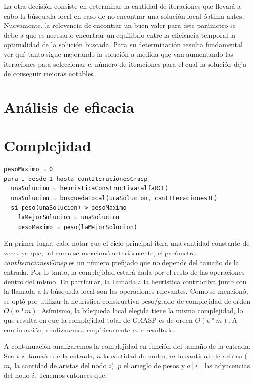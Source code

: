 \documentclass[a4paper,11pt] {article}
\begin{document}
La otra decisión consiste en determinar la cantidad de iteraciones que llevará a cabo la búsqueda local en caso de no encontrar una solución local óptima antes. Nuevamente, la relevancia de encontrar un buen valor para éste parámetro se debe a que es necesario encontrar un equilibrio entre la eficiencia temporal la optimalidad de la solución buscada. Para su determinación resulta fundamental ver qué tanto sigue mejorando la solución a medida que van aumentando las iteraciones para seleccionar el número de iteraciones para el cual la solución deja de conseguir mejoras notables.

\section*{An\'alisis de eficacia}

\section*{Complejidad}

\begin{verbatim}
pesoMaximo = 0
para i desde 1 hasta cantIteracionesGrasp
  unaSolucion = heuristicaConstructiva(alfaRCL)
  unaSolucion = busquedaLocal(unaSolucion, cantIteracionesBL)
  si peso(unaSolucion) > pesoMaximo
    laMejorSolucion = unaSolucion
    pesoMaximo = peso(laMejorSolucion)
\end{verbatim}

En primer lugar, cabe notar que el ciclo principal itera una cantidad constante de veces ya que, tal como se mencionó anteriormente, el parámetro \textit{cantIteracionesGrasp} es un número prefijado que no depende del tamaño de la entrada. Por lo tanto, la complejidad estará dada por el resto de las operaciones dentro del mismo. En particular, la llamada a la heurística contructiva junto con la llamada a la búsqueda local son las operaciones relevantes. Como se mencionó, se optó por utilizar la heurística constructiva peso/grado de complejidad de orden $O(n*m)$. Asímismo, la búsqueda local elegida tiene la misma complejidad, lo que resulta en que la complejidad total de GRASP es de orden $O(n*m)$. A continuación, analizaremos empíricamente este resultado.

A contunuaci\'on analizaremos la complejidad en funci\'on del tama\~{n}o de la entrada. Sea $t$ el tama\~{n}o de la entrada, $n$ la cantidad de nodos, $m$ la cantidad de aristas ($m_i$ la cantidad de aristas del nodo $i$), $p$ el arreglo de pesos y $a[i]$ las adyacencias del nodo $i$. Tenemos entonces que:
\end{document}
